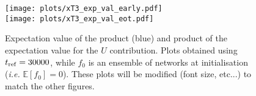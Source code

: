 


\begin{figure}[t!]
  \label{fig:xT3_exp_val}
  \centering
  \texttt{[image: plots/xT3\_exp\_val\_early.pdf]} \\
  \texttt{[image: plots/xT3\_exp\_val\_eot.pdf]}
  \caption{Expectation value of the product (blue) and product of the
  expectation value for the $U$ contribution. Plots obtained using $t_{\rm ref}
  = 30000$, while $f_0$ is an ensemble of networks at initialisation
  (\textit{i.e.} $\mathbb{E}[f_0]=0$). \ac{These plots will be modified (font
  size, etc...) to match the other figures.}} 
\end{figure}
